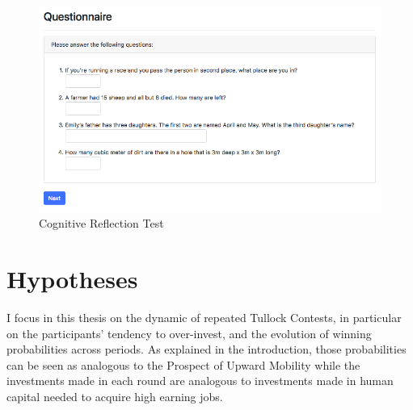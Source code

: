     \begin{figure}
        \centering
        \includegraphics[width=\textwidth]{graphs/CRT_Quest.png}
        \caption{Cognitive Reflection Test \citep{thomson2016}}
        \label{fig:crt_quest}
    \end{figure}
    
    \section{Hypotheses}\label{sec:hyp}
    
        
    


    
    
    I focus in this thesis on the dynamic of repeated Tullock Contests, in particular on the participants' tendency to over-invest, and the evolution of winning probabilities across periods. As explained in the introduction, those probabilities can be seen as analogous to the Prospect of Upward Mobility while the investments made in each round are analogous to investments made in human capital needed to acquire high earning jobs.\\
    

